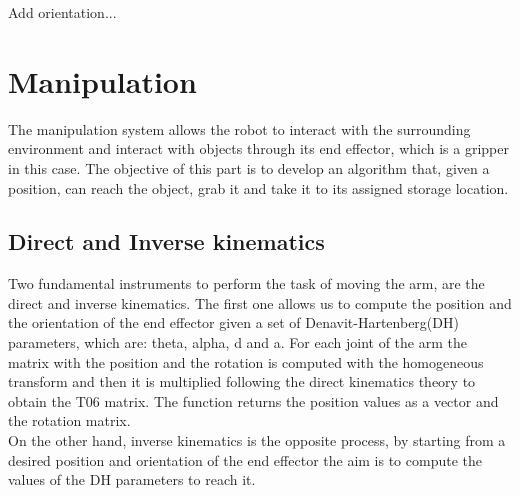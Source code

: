 \documentclass[12pt,a4paper]{article}
\begin{document}
Add orientation...  


\section{Manipulation}\label{sec:manipulation}
The manipulation system allows the robot to interact with the surrounding environment and interact with objects through its end effector, which is a gripper in this case.
The objective of this part is to develop an algorithm that, given a position, can reach the object, grab it and take it to its assigned storage location.
\subsection{Direct and Inverse kinematics}\label{subsec:kinematics}
Two fundamental instruments to perform the task of moving the arm, are the direct and inverse kinematics. The first one allows us to compute the position and the orientation of the end effector given a set of Denavit-Hartenberg(DH) parameters, which are: theta, alpha, d and a. For each joint of the arm the matrix with the position and the rotation is computed with the homogeneous transform and then it is multiplied following the direct kinematics theory to obtain the T06 matrix. The function returns the position values as a vector and the rotation matrix.\\
On the other hand, inverse kinematics is the opposite process, by starting from a desired position and orientation of the end effector the aim is to compute the values of the DH parameters to reach it.
\end{document}

